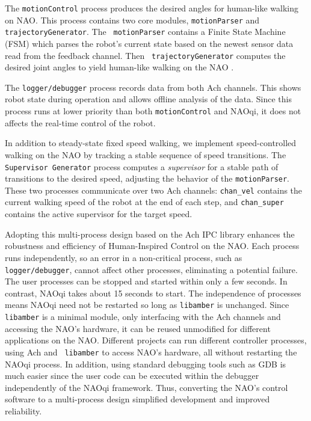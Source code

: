 The {\tt motionControl} process produces the desired angles for
human-like walking on NAO. This process contains two core modules,
{\tt motionParser} and {\tt trajectoryGenerator}. The {\tt
  motionParser} \cite{dantam2013tro} contains a Finite State Machine
(FSM) which parses the robot's current state based on the newest
sensor data read from the feedback channel. Then {\tt
  trajectoryGenerator} computes the desired joint angles to yield
human-like walking on the NAO \cite{jars_2012_psa_01}.

The {\tt logger/debugger} process records data from both Ach
channels. This shows robot state during operation and allows offline
analysis of the data.  Since this process runs at lower priority than
both {\tt motionControl} and NAOqi, it does not affects the real-time
control of the robot.

In addition to steady-state fixed speed walking, we implement
speed-controlled walking on the NAO by tracking a stable sequence of
speed transitions. The {\tt Supervisor Generator} process computes a
\emph{supervisor} for a stable path of transitions to the desired
speed, adjusting the behavior of the {\tt motionParser}.  These two
processes communicate over two Ach channels: {\tt chan\_vel} contains
the current walking speed of the robot at the end of each step, and
{\tt chan\_super} contains the active supervisor for the target speed.


Adopting this multi-process design based on the Ach IPC library
enhances the robustness and efficiency of Human-Inspired Control on
the NAO.  Each process runs independently, so an error in a
non-critical process, such as {\tt logger/debugger}, cannot affect
other processes, eliminating a potential failure.  The user processes
can be stopped and started within only a few seconds.  In contrast,
NAOqi takes about 15 seconds to start. The independence of processes
means NAOqi need not be restarted so long as {\tt libamber} is
unchanged.  Since {\tt libamber} is a minimal module, only interfacing
with the Ach channels and accessing the NAO's hardware, it can be
reused unmodified for different applications on the NAO. Different
projects can run different controller processes, using Ach and {\tt
  libamber} to access NAO's hardware, all without restarting the NAOqi
process.  In addition, using standard debugging tools such as GDB is
much easier since the user code can be executed within the debugger
independently of the NAOqi framework.  Thus, converting the NAO's
control software to a multi-process design simplified development and
improved reliability.



